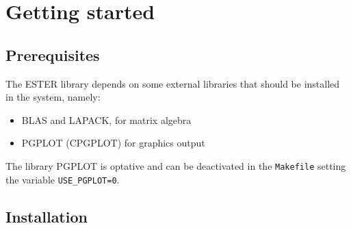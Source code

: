 \chapter{Getting started}
\section{Prerequisites}

The ESTER library depends on some external libraries that should be installed in the system, namely:
\begin{itemize}
\item BLAS and LAPACK, for matrix algebra
\item PGPLOT (CPGPLOT) for graphics output
\end{itemize}
The library PGPLOT is optative and can be deactivated in the {\tt Makefile} setting the variable {\tt USE\_PGPLOT=0}.

\section{Installation}

